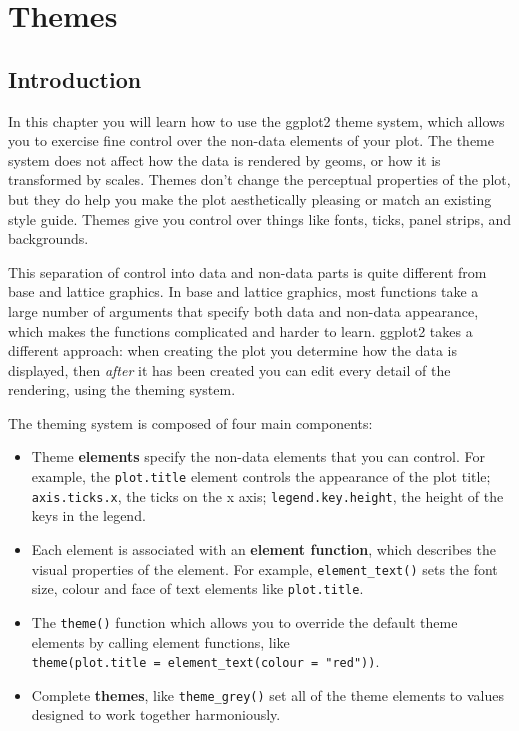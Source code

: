 \chapter{Themes}\label{cha:polishing}

\section{Introduction}

In this chapter you will learn how to use the ggplot2 theme system,
which allows you to exercise fine control over the non-data elements of
your plot. The theme system does not affect how the data is rendered by
geoms, or how it is transformed by scales. Themes don't change the
perceptual properties of the plot, but they do help you make the plot
aesthetically pleasing or match an existing style guide. Themes give you
control over things like fonts, ticks, panel strips, and backgrounds.

This separation of control into data and non-data parts is quite
different from base and lattice graphics. In base and lattice graphics,
most functions take a large number of arguments that specify both data
and non-data appearance, which makes the functions complicated and
harder to learn. ggplot2 takes a different approach: when creating the
plot you determine how the data is displayed, then \emph{after} it has
been created you can edit every detail of the rendering, using the
theming system.

The theming system is composed of four main components:

\begin{itemize}
\item
  Theme \textbf{elements} specify the non-data elements that you can
  control. For example, the \texttt{plot.title} element controls the
  appearance of the plot title; \texttt{axis.ticks.x}, the ticks on the
  x axis; \texttt{legend.key.height}, the height of the keys in the
  legend.
\item
  Each element is associated with an \textbf{element function}, which
  describes the visual properties of the element. For example,
  \texttt{element\_text()} sets the font size, colour and face of text
  elements like \texttt{plot.title}.
\item
  The \texttt{theme()} function which allows you to override the default
  theme elements by calling element functions, like
  \texttt{theme(plot.title\ =\ element\_text(colour\ =\ "red"))}.
\item
  Complete \textbf{themes}, like \texttt{theme\_grey()} set all of the
  theme elements to values designed to work together harmoniously.
\end{itemize}

